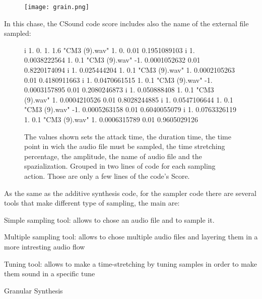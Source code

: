 		\begin{figure}[h]
			\begin{center}
				\texttt{[image: grain.png]}
			\end{center}
		\end{figure}			
		
		In this chase, the CSound code score includes also the name of the external file sampled:
		
\begin{figure}[h]
	\begin{code}
i          1.                    0.                    1.                    1.6         	"CM3 (9).wav"          1.                    0.                    0.01                  0.1951089103
i          1.                    0.0038222564          1.                    0.1         	"CM3 (9).wav"         -1.                    0.0001052632          0.01                  0.8220174094
i          1.                    0.025444204           1.                    0.1         	"CM3 (9).wav"          1.                    0.0002105263          0.01                  0.4180911663
i          1.                    0.0470661515          1.                    0.1         	"CM3 (9).wav"         -1.                    0.0003157895          0.01                  0.2080246873
i          1.                    0.050888408           1.                    0.1         	"CM3 (9).wav"          1.                    0.0004210526          0.01                  0.8028244885
i          1.                    0.0547106644          1.                    0.1         	"CM3 (9).wav"         -1.                    0.0005263158          0.01                  0.6040055079
i          1.                    0.0763326119          1.                    0.1         	"CM3 (9).wav"          1.                    0.0006315789          0.01                  0.9605029126
	\end{code}
	\caption{The values shown sets the attack time, the duration time, the time point in wich the audio file must be sampled, the time stretching percentage, the amplitude, the name of audio file and the spazialization. Grouped in two lines of code for each sampling action. Those are only a few lines of the code's Score.}
\end{figure}
		
		As the same as the additive synthesis code, for the sampler code there are several tools that make different type of sampling, the main are:
		
			\begin{compactitem}
				\item Simple sampling tool: allows to chose an audio file and to sample it.
				\item Multiple sampling tool: allows to chose multiple audio files and layering them in a more intresting audio flow
				\item Tuning tool: allows to make a time-stretching by tuning samples in order to make them sound in a specific tune
				\item Granular Synthesis
			\end{compactitem}
		
